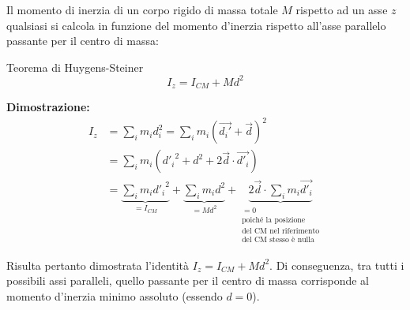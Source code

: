 Il momento di inerzia di un corpo rigido di massa totale $M$ rispetto ad un asse $z$ qualsiasi si calcola in funzione del momento d'inerzia rispetto all'asse parallelo passante per il centro di massa:
\begin{teorema}{Teorema di Huygens-Steiner}
\begin{equation}
I_z = I_{CM} + M d^2
\end{equation}
\end{teorema}

\textbf{Dimostrazione:}
\begin{align*}
I_z &= \sum_i m_i d_i^2 = \sum_i m_i ( \vec{d_i'} + \vec{d} )^2 \\
&= \sum_i m_i ( {d'_i}^2 + d^2 + 2\vec{d} \cdot \vec{d'_i} ) \\
&= \underbrace{\sum_i m_i {d'_i}^2}_{= I_{CM}} + \underbrace{\sum_i m_i d^2}_{= M d^2} + \underbrace{2\vec{d} \cdot \sum_i m_i \vec{d'_i}}_{\substack{= 0 \\ \text{poiché la posizione} \\ \text{del CM nel riferimento} \\ \text{del CM stesso è nulla}}}
\end{align*}

Risulta pertanto dimostrata l'identità $I_z = I_{CM} + M d^2$. Di conseguenza, tra tutti i possibili assi paralleli, quello passante per il centro di massa corrisponde al momento d'inerzia minimo assoluto (essendo $d=0$).

